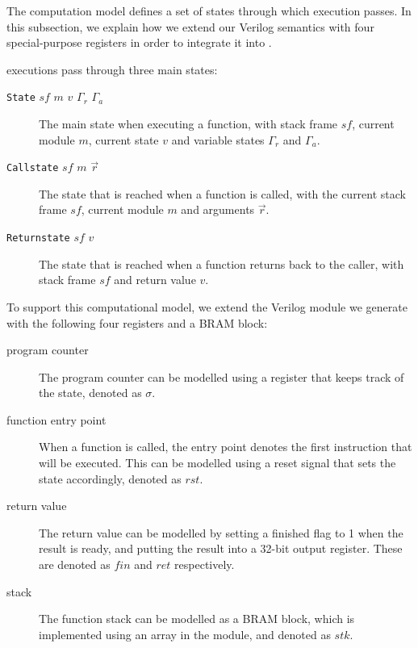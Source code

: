 The \compcert{} computation model defines a set of states through which
execution passes. In this subsection, we explain how we extend our Verilog
semantics with four special-purpose registers in order to integrate it into
\compcert{}.

\compcert{} executions pass through three main states:
\begin{description}
\item[\texttt{State} $\mathit{sf}$ $m$ $v$ $\Gamma_{r}$ $\Gamma_{a}$] The main
  state when executing a function, with stack frame $\mathit{sf}$, current
  module $m$, current state $v$ and variable states $\Gamma_{r}$ and
  $\Gamma_{a}$.
  \item[\texttt{Callstate} $\mathit{sf}$ $m$ $\vec{r}$] The state that is
    reached when a function is called, with the current stack frame
    $\mathit{sf}$, current module $m$ and arguments $\vec{r}$.
  \item[\texttt{Returnstate} $\mathit{sf}$ $v$] The state that is reached when a
    function returns back to the caller, with stack frame $\mathit{sf}$ and
    return value $v$.
\end{description}

To support this computational model, we extend the Verilog module we generate
with the following four registers and a \gls{BRAM} block:

\begin{description}
\item[program counter] The program counter can be modelled using a register that
  keeps track of the state, denoted as $\sigma$.
  \item[function entry point] When a function is called, the entry point denotes
    the first instruction that will be executed. This can be modelled using a
    reset signal that sets the state accordingly, denoted as $\mathit{rst}$.
  \item[return value] The return value can be modelled by setting a finished
    flag to 1 when the result is ready, and putting the result into a 32-bit
    output register. These are denoted as $\mathit{fin}$ and $\mathit{ret}$
    respectively.
  \item[stack] The function stack can be modelled as a \gls{BRAM} block, which
    is implemented using an array in the module, and denoted as $\mathit{stk}$.
\end{description}

